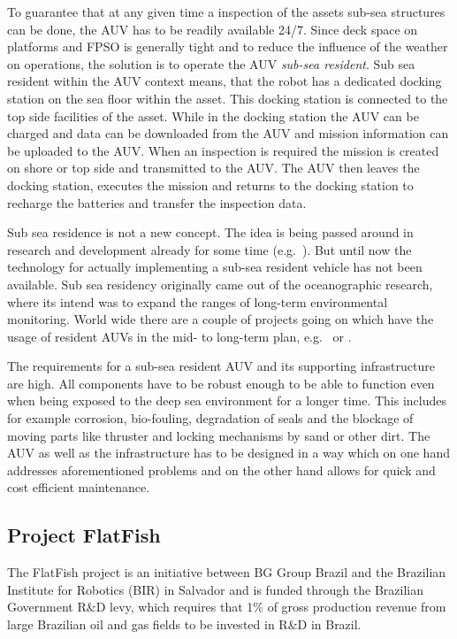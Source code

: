 \documentclass[conference]{IEEEtran}
\begin{document}
To guarantee that at any given time a inspection of the assets sub-sea structures can be done, the AUV has to be readily available 24/7. Since deck space on platforms and FPSO is generally tight and to reduce the influence of the weather on operations, the solution is to operate the AUV \textit{sub-sea resident}. Sub sea resident within the AUV context means, that the robot has a dedicated docking station on the sea floor within the asset. This docking station is connected to the top side facilities of the asset. While in the docking station the AUV can be charged and data can be downloaded from the AUV and mission information can be uploaded to the AUV. When an inspection is required the mission is created on shore or top side and transmitted to the AUV. The AUV then leaves the docking station, executes the mission and returns to the docking station to recharge the batteries and transfer the inspection data.

Sub sea residence is not a new concept. The idea is being passed around in research and development already for some time (e.g.~\cite{mcleod2011}). But until now the technology for actually implementing a sub-sea resident vehicle has not been available. Sub sea residency originally came out of the oceanographic research, where its intend was to expand the ranges of long-term environmental monitoring. World wide there are a couple of projects going on which have the usage of resident AUVs in the mid- to long-term plan, e.g.~\cite{german2012} or \cite{soltwedel2013}.

The requirements for a sub-sea resident AUV and its supporting infrastructure are high. All components have to be robust enough to be able to function even when being exposed to the deep sea environment for a longer time. This includes for example corrosion, bio-fouling, degradation of seals and the blockage of moving parts like thruster and locking mechanisms by sand or other dirt. The AUV as well as the infrastructure has to be designed in a way which on one hand addresses aforementioned problems and on the other hand allows for quick and cost efficient maintenance.

\subsection{Project FlatFish}

The FlatFish project is an initiative between BG Group Brazil and the Brazilian Institute for Robotics (BIR) in Salvador and is funded through the Brazilian Government R\&D levy, which requires that 1\% of gross production revenue from large Brazilian oil and gas fields to be invested in R\&D in Brazil.
\end{document}
